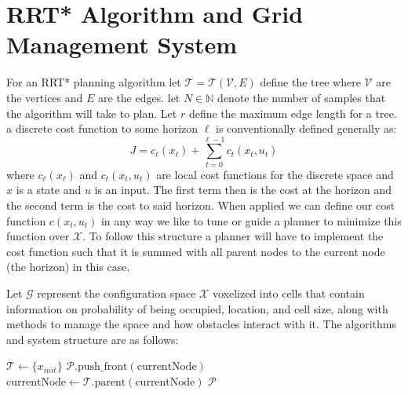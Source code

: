 \documentclass{aiaa-tc}
\begin{document}
\section{RRT* Algorithm and Grid Management System}
For an RRT* planning algorithm let \(\mathcal{T} = \mathcal{T}(\mathcal{V},E)\) define the tree where \(\mathcal{V}\) are 
the vertices and \(E\) are the edges. let \(N \in \mathbb{N}\) denote the number of samples
that the algorithm will take to plan. Let \(r\) define the maximum edge length for a tree. a discrete cost function 
to some horizon \(\ell\) is conventionally defined generally as:
\[ 
J = c_\ell(x_\ell) + \sum_{t=0}^{\ell-1} c_t(x_t, u_t) 
\]
where \(c_\ell(x_\ell)\) and \(c_t(x_t, u_t)\) are local cost functions for the discrete space and \(x\) is a state and \(u\) is an input. 
The first term then is the cost at the
horizon and the second term is the cost to said horizon. When applied we can define our cost function \(c(x_t, u_t)\) in any way we like
to tune or guide a planner to minimize this function over \(\mathcal{X}\). To follow this structure a planner will have to implement the 
cost function such that it is summed with all parent nodes
to the current node (the horizon) in this case.
    
Let \(\mathcal{G}\) represent the configuration space \(\mathcal{X}\) voxelized into cells that contain information on probability of being occupied,
location, and cell size, along with methods to manage the space and how obstacles interact with it. The algorithms and system structure are as follows:

\begin{algorithm}[H]
    \caption{RRT*}\label{alg:rrtstar}
    $\mathcal{T} \gets \{x_{init}\}$\;
     {
        $\mathcal{P}.\text{push\_front}(\text{currentNode})$\;
        $\text{currentNode} \gets \mathcal{T}.\text{parent}(\text{currentNode})$\;
    }
    \Return $\mathcal{P}$\;
\end{algorithm}
\end{document}
